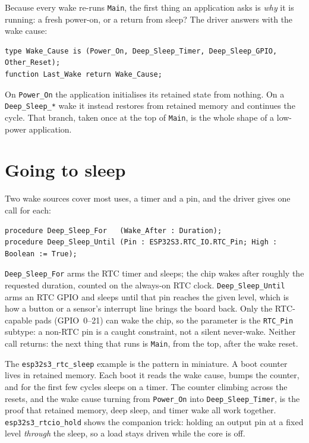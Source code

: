 Because every wake re-runs \texttt{Main}, the first thing an application asks is
\emph{why} it is running: a fresh power-on, or a return from sleep? The driver
answers with the wake cause:

\begin{lstlisting}
type Wake_Cause is (Power_On, Deep_Sleep_Timer, Deep_Sleep_GPIO, Other_Reset);
function Last_Wake return Wake_Cause;
\end{lstlisting}

On \texttt{Power\_On} the application initialises its retained state from nothing. On
a \texttt{Deep\_Sleep\_*} wake it instead restores from retained memory and continues
the cycle. That branch, taken once at the top of \texttt{Main}, is the whole shape of
a low-power application.

\section{Going to sleep}

Two wake sources cover most uses, a timer and a pin, and the driver gives one call
for each:

\begin{lstlisting}
procedure Deep_Sleep_For   (Wake_After : Duration);
procedure Deep_Sleep_Until (Pin : ESP32S3.RTC_IO.RTC_Pin; High : Boolean := True);
\end{lstlisting}

\texttt{Deep\_Sleep\_For} arms the RTC timer and sleeps; the chip wakes after roughly
the requested duration, counted on the always-on RTC clock. \texttt{Deep\_Sleep\_Until}
arms an RTC GPIO and sleeps until that pin reaches the given level, which is how a
button or a sensor's interrupt line brings the board back. Only the RTC-capable pads
(GPIO~0--21) can wake the chip, so the parameter is the \texttt{RTC\_Pin} subtype: a
non-RTC pin is a caught constraint, not a silent never-wake. Neither call returns:
the next thing that runs is \texttt{Main}, from the top, after the wake reset.

The \texttt{esp32s3\_rtc\_sleep} example is the pattern in miniature. A boot counter
lives in retained memory. Each boot it reads the wake cause, bumps the counter, and
for the first few cycles sleeps on a timer. The counter climbing across the resets,
and the wake cause turning from \texttt{Power\_On} into \texttt{Deep\_Sleep\_Timer},
is the proof that retained memory, deep sleep, and timer wake all work together.
\texttt{esp32s3\_rtcio\_hold} shows the companion trick: holding an output pin at a
fixed level \emph{through} the sleep, so a load stays driven while the core is off.

